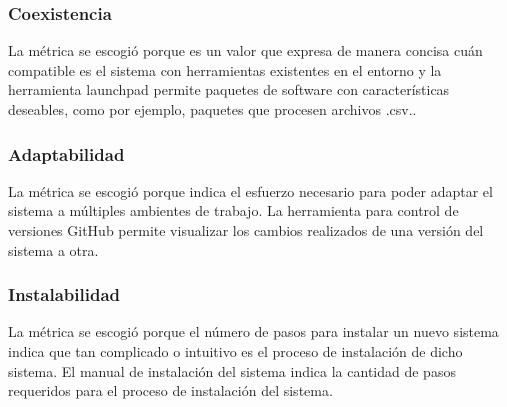 \documentclass[12pt]{article}
\begin{document}
\subsubsection{Coexistencia  }

\vspace*{0.1in}
La métrica se escogió porque es un valor que expresa de manera concisa cuán compatible es el sistema con herramientas existentes en el entorno y la herramienta launchpad permite paquetes de software con características deseables, como por ejemplo, paquetes que procesen archivos .csv..

\vspace*{0.3in}
\subsubsection{Adaptabilidad}
\vspace*{0.1in}
La métrica se escogió porque indica el esfuerzo necesario para poder adaptar el sistema a múltiples ambientes de trabajo. La herramienta para control de versiones GitHub permite visualizar los cambios realizados de una versión del sistema a otra.

\vspace*{0.3in}
\subsubsection{Instalabilidad }
\vspace*{0.1in}
La métrica se escogió porque el número de pasos para instalar un nuevo sistema indica que tan complicado o intuitivo es el proceso de instalación de dicho sistema. El manual de instalación del sistema indica la cantidad de pasos requeridos para el proceso de instalación del sistema.
\end{document}
